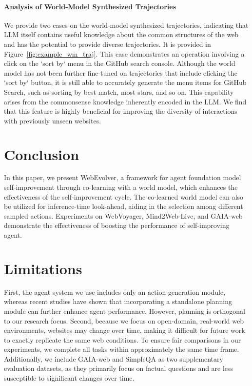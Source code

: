 \documentclass[11pt]{article}
\begin{document}
\paragraph{Analysis of World-Model Synthesized Trajectories}
We provide two cases on the world-model synthesized trajectories, indicating that LLM itself contains useful knowledge about the common structures of the web and has the potential to provide diverse trajectories.
It is provided in Figure~\ref{fig:example_wm_traj}.
This case demonstrates an operation involving a click on the `sort by` menu in the GitHub search console. 
Although the world model has not been further fine-tuned on trajectories that include clicking the `sort by` button, it is still able to accurately generate the menu items for GitHub Search, such as sorting by best match, most stars, and so on. 
This capability arises from the commonsense knowledge inherently encoded in the LLM. 
We find that this feature is highly beneficial for improving the diversity of interactions with previously unseen websites.




\section{Conclusion}

In this paper, we present WebEvolver, a framework for agent foundation model self-improvement through co-learning with a world model, which enhances the effectiveness of the self-improvement cycle. The co-learned world model can also be utilized for inference-time look-ahead, aiding in the selection among different sampled actions.
Experiments on WebVoyager, Mind2Web-Live, and GAIA-web demonstrate the effectiveness of boosting the performance of self-improving agent.



\section*{Limitations}

First, the agent system we use includes only an action generation module, whereas recent studies have shown that incorporating a standalone planning module can further enhance agent performance. However, planning is orthogonal to our research focus.
Second, because we focus on open-domain, real-world web environments, websites may change over time, making it difficult for future work to exactly replicate the same web conditions. To ensure fair comparisons in our experiments, we complete all tasks within approximately the same time frame. Additionally, we include GAIA-web and SimpleQA as two supplementary evaluation datasets, as they primarily focus on factual questions and are less susceptible to significant changes over time.
\end{document}
